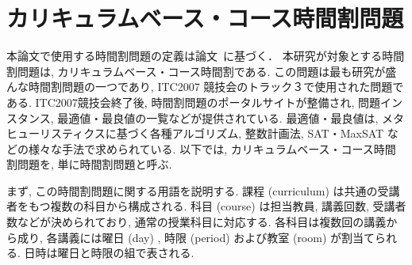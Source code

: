 \chapter{カリキュラムベース・コース時間割問題}




本論文で使用する時間割問題の定義は論文~\cite{%
  anor/Banbara2019,DBLP:journals/anor/BonuttiCGS12}に基づく．
本研究が対象とする時間割問題は, カリキュラムベース・コース時間割である. この問題は最も研究が盛んな時間割問題の一つであり, ITC2007 競技会のトラック３で使用された問題である. ITC2007競技会終了後, 時間割問題のポータルサイトが整備され, 問題インスタンス, 最適値・最良値の一覧などが提供されている. 最適値・最良値は, メタヒューリスティクスに基づく各種アルゴリズム, 整数計画法, SAT・MaxSAT などの様々な手法で求められている. 以下では, カリキュラムベース・コース時間割問題を, 単に時間割問題と呼ぶ.

まず, この時間割問題に関する用語を説明する. 課程 (curriculum) は共通の受講者をもつ複数の科目から構成される. 科目 (course) は担当教員, 講義回数, 受講者数などが決められており, 通常の授業科目に対応する. 各科目は複数回の講義から成り, 各講義には曜日 (day) , 時限 (period) および教室 (room) が割当てられる. 日時は曜日と時限の組で表される.



